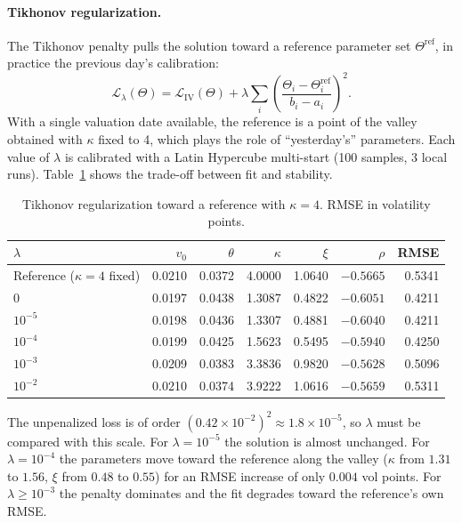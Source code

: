 \documentclass[11pt,a4paper]{article}
\theoremstyle{plain}
\theoremstyle{definition}
\begin{document}
\paragraph{Tikhonov regularization.} The Tikhonov penalty pulls the solution toward a reference parameter set $\Theta^{\mathrm{ref}}$, in practice the previous day's calibration:
\begin{equation}
    \mathcal L_\lambda(\Theta)=\mathcal L_{\mathrm{IV}}(\Theta)+\lambda\sum_{i}\left(\frac{\Theta_i-\Theta_i^{\mathrm{ref}}}{b_i-a_i}\right)^2 .
    \label{eq:tikhonov}
\end{equation}
With a single valuation date available, the reference is a point of the valley obtained with $\kappa$ fixed to 4, which plays the role of ``yesterday's'' parameters. Each value of $\lambda$ is calibrated with a Latin Hypercube multi-start (100 samples, 3 local runs). Table~\ref{tab:tikhonov} shows the trade-off between fit and stability.

\begin{table}[htbp]
\centering
\small
\begin{tabular}{@{}lrrrrrr@{}}
\toprule
$\lambda$ & $v_0$ & $\theta$ & $\kappa$ & $\xi$ & $\rho$ & RMSE \\
\midrule
Reference ($\kappa=4$ fixed) & 0.0210 & 0.0372 & 4.0000 & 1.0640 & $-0.5665$ & 0.5341 \\
$0$ & 0.0197 & 0.0438 & 1.3087 & 0.4822 & $-0.6051$ & 0.4211 \\
$10^{-5}$ & 0.0198 & 0.0436 & 1.3307 & 0.4881 & $-0.6040$ & 0.4211 \\
$10^{-4}$ & 0.0199 & 0.0425 & 1.5623 & 0.5495 & $-0.5940$ & 0.4250 \\
$10^{-3}$ & 0.0209 & 0.0383 & 3.3836 & 0.9820 & $-0.5628$ & 0.5096 \\
$10^{-2}$ & 0.0210 & 0.0374 & 3.9222 & 1.0616 & $-0.5659$ & 0.5311 \\
\bottomrule
\end{tabular}
\caption{Tikhonov regularization toward a reference with $\kappa=4$. RMSE in volatility points.}
\label{tab:tikhonov}
\end{table}

The unpenalized loss is of order $(0.42\times10^{-2})^2\approx1.8\times10^{-5}$, so $\lambda$ must be compared with this scale. For $\lambda=10^{-5}$ the solution is almost unchanged. For $\lambda=10^{-4}$ the parameters move toward the reference along the valley ($\kappa$ from $1.31$ to $1.56$, $\xi$ from $0.48$ to $0.55$) for an RMSE increase of only $0.004$ vol points. For $\lambda\ge10^{-3}$ the penalty dominates and the fit degrades toward the reference's own RMSE.
\end{document}
